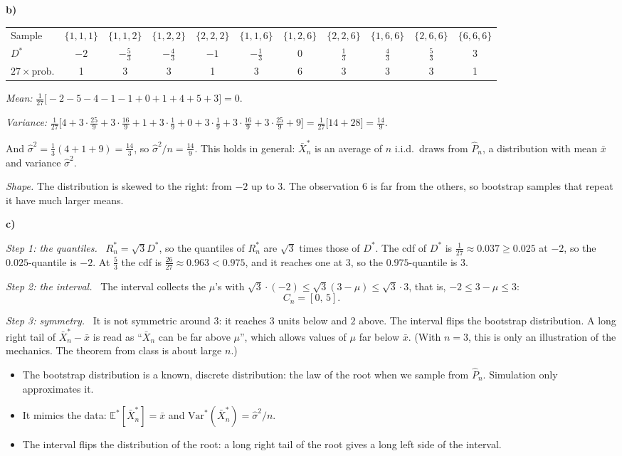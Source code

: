 \documentclass[11pt]{article}
\newcommand{\E}{\mathbb{E}}
\newcommand{\Var}{\mathrm{Var}}
\newcommand{\itm}[1]{\par\needspace{4\baselineskip}\textbf{#1)}\ }
\newcommand{\step}[1]{\par\emph{Step #1.}\ }
\begin{document}
\itm{b}
\begin{center}
\footnotesize\setlength{\tabcolsep}{4pt}
\begin{tabular}{lcccccccccc}
\toprule
Sample & $\{1,1,1\}$ & $\{1,1,2\}$ & $\{1,2,2\}$ & $\{2,2,2\}$ & $\{1,1,6\}$ & $\{1,2,6\}$ & $\{2,2,6\}$ & $\{1,6,6\}$ & $\{2,6,6\}$ & $\{6,6,6\}$\\
$D^*$ & $-2$ & $-\frac53$ & $-\frac43$ & $-1$ & $-\frac13$ & $0$ & $\frac13$ & $\frac43$ & $\frac53$ & $3$\\
$27\times$prob. & 1 & 3 & 3 & 1 & 3 & 6 & 3 & 3 & 3 & 1\\
\bottomrule
\end{tabular}
\end{center}
\emph{Mean:} $\frac1{27}\big[-2-5-4-1-1+0+1+4+5+3\big]=0$.

\emph{Variance:} $\frac1{27}\big[4+3\cdot\frac{25}9+3\cdot\frac{16}9+1+3\cdot\frac19+0+3\cdot\frac19+3\cdot\frac{16}9+3\cdot\frac{25}9+9\big]=\frac1{27}\big[14+28\big]=\frac{14}9$.

And $\hat\sigma^2=\frac13(4+1+9)=\frac{14}3$, so $\hat\sigma^2/n=\frac{14}9$. This holds in general: $\bar X^*_n$ is an average of $n$ i.i.d.\ draws from $\hat P_n$, a distribution with mean $\bar x$ and variance $\hat\sigma^2$.

\emph{Shape.} The distribution is skewed to the right: from $-2$ up to $3$. The observation $6$ is far from the others, so bootstrap samples that repeat it have much larger means.

\itm{c}
\step{1: the quantiles} $R^*_n=\sqrt3D^*$, so the quantiles of $R^*_n$ are $\sqrt3$ times those of $D^*$. The cdf of $D^*$ is $\frac1{27}\approx0.037\ge0.025$ at $-2$, so the $0.025$-quantile is $-2$. At $\frac53$ the cdf is $\frac{26}{27}\approx0.963<0.975$, and it reaches one at $3$, so the $0.975$-quantile is $3$.

\step{2: the interval} The interval collects the $\mu$'s with $\sqrt3\cdot(-2)\le\sqrt3(3-\mu)\le\sqrt3\cdot3$, that is, $-2\le3-\mu\le3$:
\[
C_n=[0,\,5].
\]
\step{3: symmetry} It is not symmetric around $3$: it reaches $3$ units below and $2$ above. The interval flips the bootstrap distribution. A long right tail of $\bar X^*_n-\bar x$ is read as ``$\bar X_n$ can be far above $\mu$'', which allows values of $\mu$ far below $\bar x$. (With $n=3$, this is only an illustration of the mechanics. The theorem from class is about large $n$.)

\begin{takeaway}
\begin{itemize}
	\item The bootstrap distribution is a known, discrete distribution: the law of the root when we sample from $\hat P_n$. Simulation only approximates it.
	\item It mimics the data: $\E^*[\bar X^*_n]=\bar x$ and $\Var^*(\bar X^*_n)=\hat\sigma^2/n$.
	\item The interval flips the distribution of the root: a long right tail of the root gives a long left side of the interval.
\end{itemize}
\end{takeaway}
\end{document}
